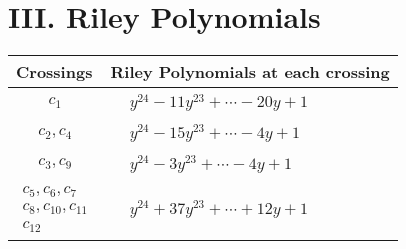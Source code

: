 \documentclass[1p]{elsarticle_modified}
\theoremstyle{definition}
\begin{document}
\centering \section*{ III. Riley Polynomials}
\begin{tabular}{m{50pt}|m{274pt}}
Crossings & \hspace{64pt}Riley Polynomials at each crossing \\
\hline $$\begin{aligned}c_{1}\end{aligned}$$&$\begin{aligned}
&y^{24}-11 y^{23}+\cdots-20 y+1
\end{aligned}$\\
\hline $$\begin{aligned}c_{2},c_{4}\end{aligned}$$&$\begin{aligned}
&y^{24}-15 y^{23}+\cdots-4 y+1
\end{aligned}$\\
\hline $$\begin{aligned}c_{3},c_{9}\end{aligned}$$&$\begin{aligned}
&y^{24}-3 y^{23}+\cdots-4 y+1
\end{aligned}$\\
\hline $$\begin{aligned}c_{5},c_{6},c_{7}\\c_{8},c_{10},c_{11}\\c_{12}\end{aligned}$$&$\begin{aligned}
&y^{24}+37 y^{23}+\cdots+12 y+1
\end{aligned}$\\
\hline
\end{tabular}
\vskip 2pc
\end{document}
